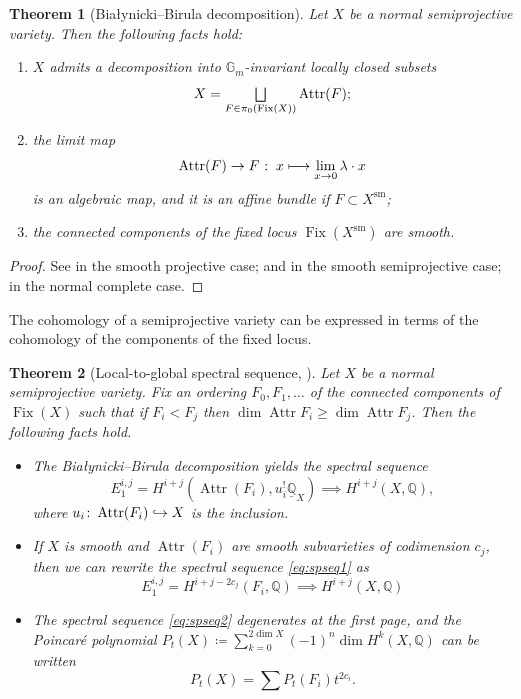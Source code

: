 \documentclass[JEP,XML,SOM,Unicode, NoEqCountersInSection,NoFloatCountersInSection,published]{cedram}
\newcommand\mto{\mathchoice{\longmapsto}{\mapsto}{\mapsto}{\mapsto}}
\newcommand\hto{\mathrel{\lhook\joinrel\to}}
\let\oldbigsqcup\bigsqcup
\renewcommand{\bigsqcup}{\mathop{\textstyle\oldbigsqcup}\displaylimits}
\newtheorem{thm}{Theorem}[section]
\theoremstyle{definition}
\newcommand{\Gm}{\mathbb{G}_m}
\newcommand{\QQ}{\mathbb{Q}}
\newcommand{\Attr}{\operatorname{Attr}}
\newcommand{\Fix}{\operatorname{Fix}}
\begin{document}
\begin{thm}[Białynicki--Birula decomposition]\label{BBdecomposition}
Let $X$ be a normal semiprojective variety. Then the following facts hold:
\begin{enumerate}
\item $X$ admits a decomposition into $\Gm$\nobreakdash-invariant locally closed subsets
\[
X = \bigsqcup_{F \in \pi_0(\Fix(X))} \Attr(F);
\]
\item \label{limitmap} the limit map
\[
\Attr(F) \to F \:\colon\: x \mto \lim_{x \to 0}\lambda \cdot x
\]
is an algebraic map, and it is an affine bundle if $F \subset X^{\mathrm{sm}}$;
\item the connected components of the fixed locus $\Fix(X^{\mathrm{sm}})$ are smooth.
\end{enumerate}
\end{thm}
\begin{proof}
See \cite[Th.\,4.3]{BB73} in the smooth projective case; \cite[\S 1.2]{HauselVillegas15} and \cite[Lem.\,3.2.4]{MaulikOkunkov19} in the smooth semiprojective case; \cite[Cor.\,4]{Weber17} in the normal complete case.
\end{proof}

The cohomology of a semiprojective variety can be expressed in terms of the cohomology of the components of the fixed locus.
\begin{thm}[Local-to-global spectral sequence, {\cite[\S 4.4]{Williamson20}}]\label{local-to-globalspseq}
Let $X$ be a normal semiprojective variety. Fix an ordering $F_0, F_1, \ldots$ of the connected components of $\Fix(X)$ such that if $F_i < F_j$ then $\dim \Attr F_i \geq \dim \Attr F_j$. Then the following facts hold.
\begin{itemize}
\item The Białynicki--Birula decomposition yields the spectral sequence
\begin{equation}\label{eq:spseq1}
E^{i,j}_1= H^{i+j}(\Attr(F_i), u^{!}_i \underline{\QQ}_X) \implies H^{i+j}(X, \QQ),
\end{equation}
where $u_i \colon \Attr(F_i) \hto X$ is the inclusion.
\item If $X$ is smooth and $\Attr(F_i)$ are smooth subvarieties of codimension $c_j$, then we can rewrite the spectral sequence \eqref{eq:spseq1} as\vspace*{-3pt}
\begin{equation}\label{eq:spseq2}
E^{i,j}_1= H^{i+j-2c_j}(F_i, \QQ) \implies H^{i+j}(X, \QQ)
\end{equation}
\item The spectral sequence \eqref{eq:spseq2} degenerates at the first page, and the Poincaré polynomial $P_t(X)\coloneqq \sum^{2\dim X}_{k=0} (-1)^n \dim H^k(X, \QQ)$ can be written\vspace*{-3pt}
\[
P_t(X) = \sum P_t(F_i)t^{2c_i}.
\]
\end{itemize}
\end{thm}
\end{document}
